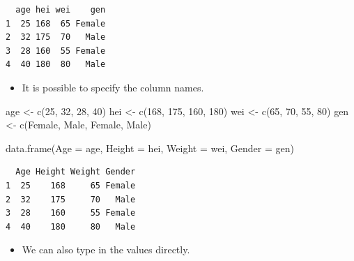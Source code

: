 \documentclass[
  letterpaper,
  DIV=11,
  numbers=noendperiod]{scrreprt}
\newenvironment{Shaded}{\begin{snugshade}}{\end{snugshade}}
\newcommand{\AttributeTok}[1]{\textcolor[rgb]{0.40,0.45,0.13}{#1}}
\newcommand{\DecValTok}[1]{\textcolor[rgb]{0.68,0.00,0.00}{#1}}
\newcommand{\FunctionTok}[1]{\textcolor[rgb]{0.28,0.35,0.67}{#1}}
\newcommand{\NormalTok}[1]{\textcolor[rgb]{0.00,0.23,0.31}{#1}}
\newcommand{\OtherTok}[1]{\textcolor[rgb]{0.00,0.23,0.31}{#1}}
\newcommand{\StringTok}[1]{\textcolor[rgb]{0.13,0.47,0.30}{#1}}
\providecommand{\tightlist}{%
  \setlength{\itemsep}{0pt}\setlength{\parskip}{0pt}}\usepackage{longtable,booktabs,array}
\begin{document}
\begin{verbatim}
  age hei wei    gen
1  25 168  65 Female
2  32 175  70   Male
3  28 160  55 Female
4  40 180  80   Male
\end{verbatim}

\begin{itemize}
\tightlist
\item
  It is possible to specify the column names.
\end{itemize}

\begin{Shaded}
\begin{Highlighting}[]
\NormalTok{age }\OtherTok{\textless{}{-}} \FunctionTok{c}\NormalTok{(}\DecValTok{25}\NormalTok{, }\DecValTok{32}\NormalTok{, }\DecValTok{28}\NormalTok{, }\DecValTok{40}\NormalTok{)}
\NormalTok{hei }\OtherTok{\textless{}{-}} \FunctionTok{c}\NormalTok{(}\DecValTok{168}\NormalTok{, }\DecValTok{175}\NormalTok{, }\DecValTok{160}\NormalTok{, }\DecValTok{180}\NormalTok{)}
\NormalTok{wei }\OtherTok{\textless{}{-}} \FunctionTok{c}\NormalTok{(}\DecValTok{65}\NormalTok{, }\DecValTok{70}\NormalTok{, }\DecValTok{55}\NormalTok{, }\DecValTok{80}\NormalTok{)}
\NormalTok{gen }\OtherTok{\textless{}{-}} \FunctionTok{c}\NormalTok{(}\StringTok{\textquotesingle{}Female\textquotesingle{}}\NormalTok{, }\StringTok{\textquotesingle{}Male\textquotesingle{}}\NormalTok{, }\StringTok{\textquotesingle{}Female\textquotesingle{}}\NormalTok{, }\StringTok{\textquotesingle{}Male\textquotesingle{}}\NormalTok{)}

\FunctionTok{data.frame}\NormalTok{(}\AttributeTok{Age =}\NormalTok{ age, }\AttributeTok{Height =}\NormalTok{ hei, }\AttributeTok{Weight =}\NormalTok{ wei, }\AttributeTok{Gender =}\NormalTok{ gen)}
\end{Highlighting}
\end{Shaded}

\begin{verbatim}
  Age Height Weight Gender
1  25    168     65 Female
2  32    175     70   Male
3  28    160     55 Female
4  40    180     80   Male
\end{verbatim}

\begin{itemize}
\tightlist
\item
  We can also type in the values directly.
\end{itemize}
\end{document}
